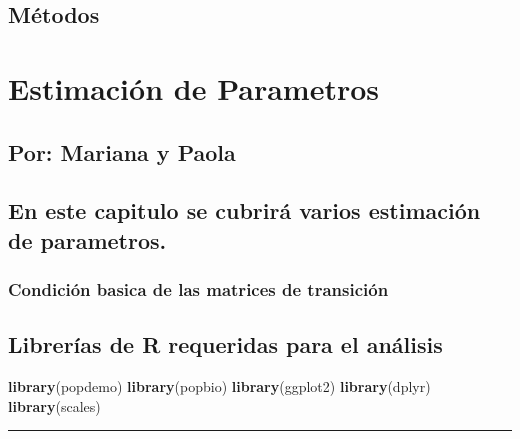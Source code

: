 \documentclass[
]{book}
\newenvironment{Shaded}{\begin{snugshade}}{\end{snugshade}}
\newcommand{\FunctionTok}[1]{\textcolor[rgb]{0.13,0.29,0.53}{\textbf{#1}}}
\newcommand{\NormalTok}[1]{#1}
\theoremstyle{definition}
\theoremstyle{definition}
\theoremstyle{definition}
\theoremstyle{definition}
\theoremstyle{remark}
\begin{document}
\section{Métodos}\label{muxe9todos}

\chapter{Estimación de Parametros}\label{estimaciuxf3n-de-parametros}

\section{Por: Mariana y Paola}\label{por-mariana-y-paola}

\section{En este capitulo se cubrirá varios estimación de parametros.}\label{en-este-capitulo-se-cubriruxe1-varios-estimaciuxf3n-de-parametros.}

\subsection{Condición basica de las matrices de transición}\label{condiciuxf3n-basica-de-las-matrices-de-transiciuxf3n}

\section{Librerías de R requeridas para el análisis}\label{libreruxedas-de-r-requeridas-para-el-anuxe1lisis}

\begin{Shaded}
\begin{Highlighting}[]
\FunctionTok{library}\NormalTok{(popdemo)}
\FunctionTok{library}\NormalTok{(popbio)}
\FunctionTok{library}\NormalTok{(ggplot2)}
\FunctionTok{library}\NormalTok{(dplyr)}
\FunctionTok{library}\NormalTok{(scales)}
\end{Highlighting}
\end{Shaded}

\begin{center}\rule{0.5\linewidth}{0.5pt}\end{center}
\end{document}
